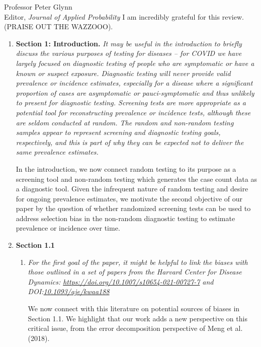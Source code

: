 \documentclass[11pt]{letter} %
\begin{document}
\begin{letter}{Professor
	Peter Glynn\\
	Editor, {\em Journal of Applied Probability}}
I am incredibly grateful for this review. (PRAISE OUT THE WAZZOOO).

\begin{enumerate}
\item {\bf Section 1: Introduction.} {\it It may be useful in the introduction to briefly discuss the various purposes of testing for diseases – for COVID we have largely focused on diagnostic testing of people who are symptomatic or have a known or suspect exposure. Diagnostic testing will never provide valid prevalence or incidence estimates, especially for a disease where a significant proportion of cases are asymptomatic or pauci-symptomatic and thus unlikely to present for diagnostic testing. Screening tests are more appropriate as a potential tool for reconstructing prevalence or incidence tests, although these are seldom conducted at random. The random and non-random testing samples appear to represent screening and diagnostic testing goals, respectively, and this is part of why they can be expected not to deliver the same prevalence estimates.}

\vspace{5mm}
In the introduction, we now connect random testing to its purpose as a screening tool and non-random testing which generates the case count data as a diagnostic tool.  Given the infrequent nature of random testing and desire for ongoing prevalence estimates, we motivate the second objective of our paper by the question of whether randomized screening tests can be used to address selection bias in the non-random diagnostic testing to estimate prevalence or incidence over time.
\vspace{5mm}

\item {\bf Section 1.1}
\begin{enumerate}
	\item {\it For the first goal of the paper, it might be helpful to link the biases with those outlined in a set of papers from the Harvard Center for Disease Dynamics: \url{https://doi.org/10.1007/s10654-021-00727-7} and DOI:\url{10.1093/aje/kwaa188}}
	\vspace{5mm}

	We now connect with this literature on potential sources of biases in Section 1.1.  We highlight that our work adds a new perspective on this critical issue, from the error decomposition perspective of Meng et al. (2018).
	\vspace{5mm}


\end{enumerate}
\end{enumerate}
\end{letter}
\end{document}
